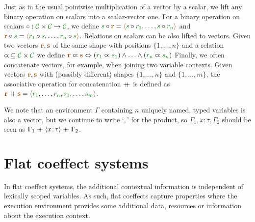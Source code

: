 Just as in the usual pointwise multiplication of a vector by a scalar, we lift any binary operation on scalars into a
scalar-vector one. For a binary operation on scalars $\circ : \C \times \C \rightarrow \C$, we define
 $\cclrd{s} \circ \aclrd{\textbf{r}} = \alift{ \cclrd{s}\circ\cclrd{r_1}, \ldots, \cclrd{s}\circ\cclrd{r_n}}$
 and $\aclrd{\textbf{r}}\circ\cclrd{s} = \alift{ \cclrd{r_1}\circ\cclrd{s}, \ldots, \cclrd{r_n}\circ\cclrd{s}}$.
Relations on scalars can be also lifted to vectors. Given two vectors $\aclrd{\textbf{r}}, \aclrd{\textbf{s}}$ of the
same shape with positions $\{ 1, \ldots, n \}$ and a relation $\varpropto\, \subseteq \C \times \C$ we define
$\aclrd{\textbf{r}} \varpropto \aclrd{\textbf{s}} \Leftrightarrow (\cclrd{r_1} \varpropto \cclrd{s_1}) \wedge \ldots \wedge (\cclrd{r_n} \varpropto \cclrd{s_n}) $
Finally, we often concatenate vectors, for example, when joining two variable contexts.
Given vectors $\aclrd{\textbf{r}}, \aclrd{\textbf{s}}$ with (possibly different) shapes $\{ 1, \ldots, n \}$ and
$\{ 1, \ldots, m \}$, the associative operation for concatenation $\mathbin{+\mkern-10mu+}$ is defined as
$\aclrd{\textbf{r}}\vtimes\aclrd{\textbf{s}} = \alift{\cclrd{r_1},\ldots,\cclrd{r_n},\cclrd{s_1},\ldots,\cclrd{s_m}}$.

We note that an environment $\Gamma$ containing $n$ uniquely named, typed variables is also a vector,
but we continue to write `$,$' for the product, so $\Gamma_1, x\!:\!\tau, \Gamma_2$ should
be seen as $\Gamma_1 \mathbin{+\mkern-10mu+} \langle x\!:\!\tau\rangle \mathbin{+\mkern-10mu+} \Gamma_2$.




%
%

\section{Flat coeffect systems}
\label{sec:applications-flat}

In flat coeffect systems, the additional contextual information is independent of lexically scoped
variables. As such, flat coeffects capture properties where the execution environment provides some
additional data, resources or information about the execution context.

